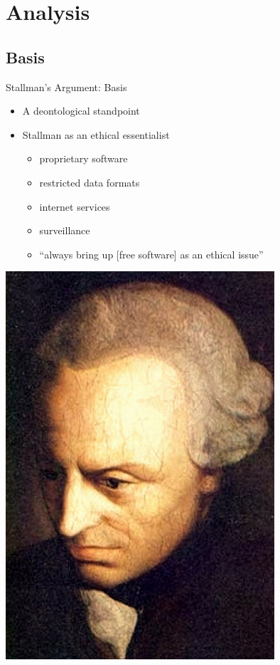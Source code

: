 \section{Analysis}\frame{\sectionpage}

\subsection{Basis}
\begin{frame}{Stallman's Argument: Basis}
  \begin{minipage}{0.5\textwidth}
    \begin{itemize}
      \item A deontological standpoint
      \item Stallman as an ethical essentialist
        \begin{itemize}
          \item proprietary software
          \item restricted data formats
          \item internet services
          \item surveillance
        \end{itemize}
        \begin{itemize}
          \item ``always bring up [free software] as an ethical issue''~\cite[para. 63]{rms2011}
        \end{itemize}
    \end{itemize}
  \end{minipage} %
  \begin{minipage}{0.45\textwidth}
    \includegraphics[width = 0.75\textwidth]{kant.jpg}
  \end{minipage}
\end{frame}


